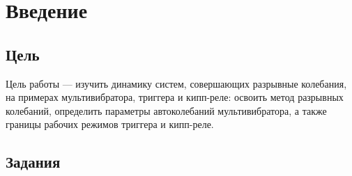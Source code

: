 \section{Введение}
\subsection*{Цель} 

Цель работы --- изучить динамику систем, совершающих разрывные колебания, на примерах мультивибратора, триггера и кипп-реле: освоить метод разрывных колебаний, определить параметры автоколебаний мультивибратора, а также границы рабочих режимов триггера и кипп-реле.

\subsection*{Задания} 
